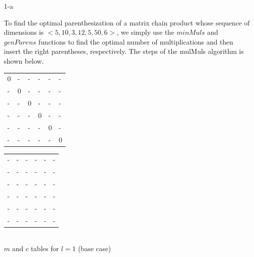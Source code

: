 \documentclass[11pt]{article}
\begin{document}

\begin{prob}{1-a}
\end{prob}
\begin{sol}

To find the optimal parenthesization of a matrix chain product whose sequence of dimensions is $<5, 10, 3, 12, 5, 50, 6>$, we simply use the $minMuls$ and $genParens$ functions to find the optimal number of multiplications and then insert the right parentheses, respectively. The steps of the mulMuls algorithm is shown below. \\

{
	\centering
	\begin{tabular}{|l|l|l|l|l|l|}
		 \hline
        0 & - & - & - & - & - \\ 
        - & 0 & - & - & - & - \\ 
        - & - & 0 & - & - & - \\ 
        - & - & - & 0 & - & - \\ 
        - & - & - & - & 0 & - \\ 
        - & - & - & - & - & 0 \\
        \hline
	\end{tabular}
	\hspace{20mm}
	\begin{tabular}{|l|l|l|l|l|l|}
		 \hline
        - & - & - & - & - & - \\ 
        - & - & - & - & - & - \\ 
        - & - & - & - & - & - \\ 
        - & - & - & - & - & - \\ 
        - & - & - & - & - & - \\ 
        - & - & - & - & - & - \\
        \hline
	\end{tabular}\\
\vspace{0.5cm}
$m$ and $c$ tables for $l = 1$ (base case)\\
\vspace{0.5cm}



}
\end{sol}
\end{document}
